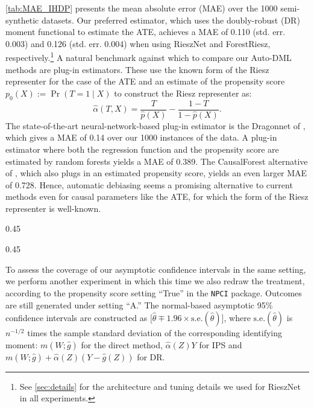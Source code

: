 \documentclass[nohyperref]{article}
\newcommand{\wt}{\widehat{\theta}}
\theoremstyle{plain}
\theoremstyle{definition}
\theoremstyle{remark}
\begin{document}
\cref{tab:MAE_IHDP} presents the mean absolute error (MAE) over the 1000 semi-synthetic datasets. Our preferred estimator, which uses the doubly-robust (DR) moment functional to estimate the ATE, achieves a MAE of 0.110 (std. err. 0.003) and 0.126 (std. err. 0.004) when using RieszNet and ForestRiesz, respectively.\footnote{See \cref{sec:details} for the architecture and tuning details we used for RieszNet in all experiments.} A natural benchmark against which to compare our Auto-DML methods are plug-in estimators. These use the known form of the Riesz representer for the case of the ATE and an estimate of the propensity score $p_0(X) := \Pr(T = 1 \mid X)$ to construct the Riesz representer as: $$\widehat{\alpha}(T,X) = \frac{T}{\widehat{p}(X)} - \frac{1 - T}{1 - \widehat{p}(X)}.$$
The state-of-the-art neural-network-based plug-in estimator is the Dragonnet of \citet{shi2019adapting}, which gives a MAE of 0.14 over our 1000 instances of the data. A plug-in estimator where both the regression function and the propensity score are estimated by random forests yields a MAE of 0.389. The CausalForest alternative of \citet{athey2019generalized}, which also plugs in an estimated propensity score, yields an even larger MAE of 0.728. Hence, automatic debiasing seems a promising alternative to current methods even for causal parameters like the ATE, for which the form of the Riesz representer is well-known.

\begin{table}[!htbp]
    \centering
    \caption{RieszNet and ForestRiesz: Mean Absolute Error (MAE) and its standard error over 1000 semi-synthetic datasets based on the IHDP experiment.}
    \label{tab:MAE_IHDP}
    \begin{subtable}{0.45\textwidth}
    \centering
    \caption{RieszNet}
    
    \end{subtable}
    
    \vspace{1em}
    \begin{subtable}{0.45\textwidth}
    \centering
    \caption{ForestRiesz}
    
    \end{subtable}
\end{table}

To assess the coverage of our asymptotic confidence intervals in the same setting, we perform another experiment in which this time we also redraw the treatment, according to the propensity score setting ``True'' in the \texttt{NPCI} package. Outcomes are still generated under setting ``A.'' The normal-based asymptotic 95\% confidence intervals are constructed as $\big[\wt \mp 1.96 \times \mathrm{s.e.}(\wt)\big]$, where $\mathrm{s.e.}(\wt)$ is $n^{-1/2}$ times the sample standard deviation of the corresponding identifying moment: $m(W; \widehat{g})$ for the direct method, $\widehat{\alpha}(Z)Y$ for IPS and $m(W; \widehat{g}) + \widehat{\alpha}(Z)(Y - \widehat{g}(Z))$ for DR.
\end{document}
